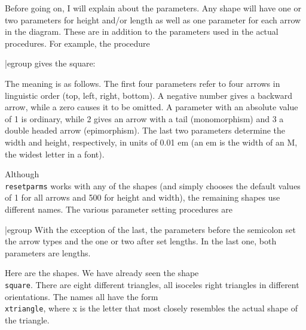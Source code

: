{{{{{Before going on, I will explain about the parameters.  Any shape will
have one or two parameters for height and/or length as well as one
parameter for each arrow in the diagram.  These are in addition to the
parameters used in the actual procedures.  For example, the procedure
{\verbatim
\begin{center}
\setsqparms[-1`0`2`-3;1000`700]
\square[A`B`C`D;f`g`h`k]
\end{center}
|egroup
gives the square:
\begin{center}
\setsqparms[-1`0`2`-3;1000`700]
\square[A`B`C`D;f`g`h`k]
\end{center}
The meaning is as follows.  The first four parameters refer to four
arrows in linguistic order (top, left, right, bottom).  A negative
number gives a backward arrow, while a zero causes it to be omitted.  A
parameter with an absolute value of 1 is ordinary, while 2 gives an
arrow with a tail (monomorphism) and 3 a double headed arrow
(epimorphism).  The last two parameters determine the width and height,
respectively, in units of 0.01 em (an em is the width of an M, the
widest letter in a font).

Although {\tt \\resetparms} works with any of the shapes (and simply
chooses
the default values of 1 for all arrows and 500 for height and width),
the remaining shapes use different names.  The various parameter setting
procedures are
{\verbatim
\setsqparms[#1`#2`#3`#4;#5`#6]
\settriparms[#1`#2`#3;#4]
\settripairparms[#1`#2`#3`#4`#5;#6]
\setrecparms[#1`#2]
|egroup
With the exception of the last, the parameters before the semicolon set
the arrow types and the one or two after set lengths.  In the last one,
both parameters are lengths.

Here are the shapes.  We have already seen the shape {\tt \\square}.
There are eight different triangles, all isoceles right triangles in
different orientations.  The names all have the form {\tt
\\xtriangle}, where x is the letter that most closely resembles the
actual shape of the triangle.

}}}}}}}
